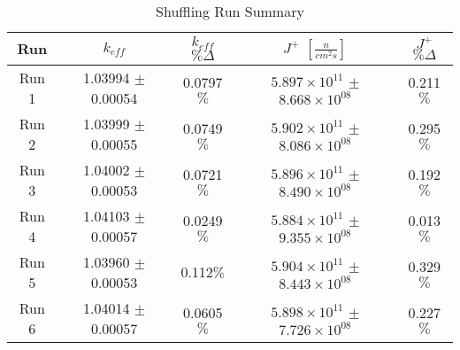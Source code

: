 

\begin{table}[H]
\centering
 \begin{tabularx}{0.7\textwidth}{c  c  c  c  c}
 	\hline
 	Run & $k_{eff}$ & $k_{eff}$ $\% \Delta$ & $J^+$  $[\frac{n}{cm^2s}]$ & $J^+$ $\% \Delta$ \\
 	\hline
 	Run 1 & 1.03994 $\pm$ 0.00054 & 0.0797$\%$ & $5.897\times10^{11}$ $\pm$ $8.668\times10^{08}$ & 0.211$\%$ \\
 	Run 2 & 1.03999 $\pm$ 0.00055 & 0.0749$\%$ & $5.902\times10^{11}$ $\pm$ $8.086\times10^{08}$  & 0.295$\%$ \\
 	Run 3 & 1.04002 $\pm$ 0.00053 & 0.0721$\%$ & $5.896\times10^{11}$ $\pm$ $8.490\times10^{08}$ & 0.192$\%$  \\
 	Run 4 & 1.04103 $\pm$ 0.00057 & 0.0249$\%$ & $5.884\times10^{11}$ $\pm$ $9.355\times10^{08}$ & 0.013$\%$ \\
 	Run 5 & 1.03960 $\pm$ 0.00053 & 0.112$\%$ & $5.904\times10^{11}$ $\pm$ $8.443\times10^{08}$ & 0.329$\%$  \\
 	Run 6 & 1.04014 $\pm$ 0.00057 & 0.0605$\%$ & $5.898\times10^{11}$ $\pm$ $7.726\times10^{08}$ & 0.227$\%$ \\
 	\hline

 \end{tabularx}
\caption{Shuffling Run Summary}
\label{table:shufsens}
\end{table}